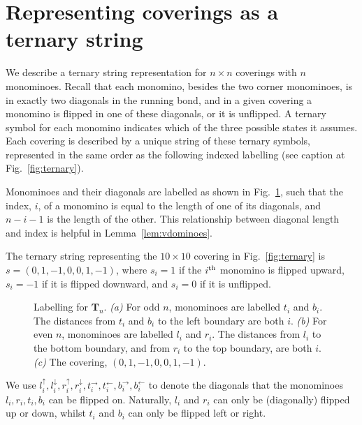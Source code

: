 \documentclass[12pt]{amsart}
\newcommand{\lref}[1]{Lemma~\ref{lem:#1}}
\newcommand{\fref}[1]{Fig.~\ref{fig:#1}}
\newcommand\ldown[1]{l_{#1}^\downarrow}
\newcommand\lup[1]{l_{#1}^\uparrow}
\newcommand\rdown[1]{r_{#1}^\downarrow}
\newcommand\rup[1]{r_{#1}^\uparrow}
\newcommand\tright[1]{t_{#1}^\rightarrow}
\newcommand\tleft[1]{t_{#1}^\leftarrow}
\newcommand\bright[1]{b_{#1}^\rightarrow}
\newcommand\bleft[1]{b_{#1}^\leftarrow}
\newcommand{\Tn}[1]{\mathbf T_{#1}}
\begin{document}
\section{Representing coverings as a ternary string}
\label{sec:representation}
We describe a ternary string representation for $n\times n$ coverings
with $n$ monominoes.  Recall that each monomino, besides the two
corner monominoes, is in exactly two diagonals in the running bond,
and in a given covering a monomino is flipped in one of these
diagonals, or it is unflipped.  A ternary symbol for each monomino
indicates which of the three possible states it assumes.  Each
covering is described by a unique string of these ternary symbols,
represented in the same order as the following indexed labelling (see
caption at \fref{ternary}).

Monominoes and their diagonals are labelled as shown in
\fref{labelling}, such that the index, $i$, of a monomino is equal to
the length of one of its diagonals, and $n-i-1$ is the length of the
other.  This relationship between diagonal length and index is helpful
in \lref{vdominoes}.

The ternary string representing the $10\times 10$ covering in
\fref{ternary} is $s=(0,1,-1,0,0,1,-1)$, where $s_i=1$ if the
$i^\textup{th}$ monomino is flipped upward, $s_i=-1$ if it is flipped
downward, and $s_i=0$ if it is unflipped.

\begin{figure}[h]
  \centering \subfigure[]{
    \label{fig:oddlabelling}}%
  \subfigure[]{%
    \label{fig:evenlabelling}}%
  \subfigure[]{%
    \label{fig:ternary}}%
  \caption{Labelling for $\Tn{n}$. \emph{(a)} For odd $n$, monominoes
    are labelled $t_i$ and $b_i$.  The distances from $t_i$ and $b_i$
    to the left boundary are both $i$. \emph{(b)} For even $n$,
    monominoes are labelled $l_i$ and $r_i$.  The distances from $l_i$
    to the bottom boundary, and from $r_i$ to the top boundary, are
    both $i$.  \emph{(c)} The covering, $(0,1,-1,0,0,1,-1)$.}
  \label{fig:labelling}
\end{figure}

We use $\lup{i}, \ldown{i},
\rup{i},\rdown{i},\tright{i},\tleft{i},\bright{i},\bleft{i}$ to denote
the diagonals that the monominoes $l_i,r_i,t_i,b_i$ can be flipped on.
Naturally, $l_i$ and $r_i$ can only be (diagonally) flipped up or
down, whilst $t_i$ and $b_i$ can only be flipped left or right.
\end{document}
